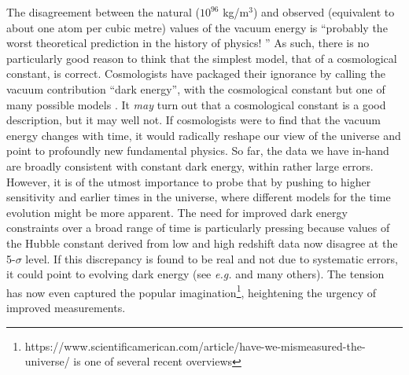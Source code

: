 \documentclass[letterpaper,11pt,preprint]{aastex}
\begin{document}
The disagreement between the natural ($10^{96}$ kg/m$^3$) and observed
(equivalent to about one atom per cubic metre) values of the vacuum
energy is ``probably the worst theoretical prediction in the history
of physics! \citep{Hobson06}'' As such, there is no particularly good
reason to think that the simplest model, that of a cosmological
constant, is correct.  Cosmologists have packaged their ignorance by
calling the vacuum contribution ``dark energy'', with the cosmological
constant but one of many possible models \citep{Ratra88,Steinhardt99}.
It {\textit{may}} turn out that a cosmological constant is a good
description, but it may well not.  If cosmologists were to find that
the vacuum energy changes with time, it would radically reshape our
view of the universe and point to profoundly new fundamental physics.
So far, the data we have in-hand are broadly consistent with constant
dark energy, within rather large errors.  However, it is of the utmost
importance to probe that by pushing to higher sensitivity and earlier
times in the universe, where different models for the time evolution
might be more apparent.  The need for improved dark energy constraints
over a broad range of time is particularly pressing because
values of the Hubble constant derived from low and high redshift data
now disagree at the 5-$\sigma$ level.  If this discrepancy is found to
be real and not due to systematic errors, it could point to evolving
dark energy (see {\it{e.g.}} \citet{Freedman2017} and many others).
The tension has now even captured the popular
imagination\footnote{https://www.scientificamerican.com/article/have-we-mismeasured-the-universe/
  is one of several recent overviews}, heightening the urgency of
improved measurements.


\end{document}
